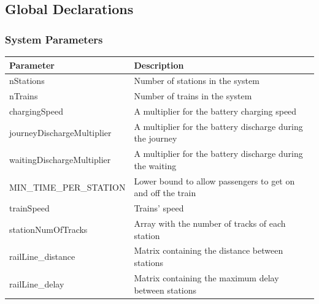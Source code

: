 \subsection{Global Declarations}
\subsubsection{System Parameters}

\begin{table} [H]
    \begin{tabu} to \textwidth {|X|X[2]|}
        \hline
        \textbf{Parameter}              & \textbf{Description} \\  \hline
        nStations                       & Number of stations in the system \\  \hline
        nTrains                         & Number of trains in the system \\    \hline
        chargingSpeed                   & A multiplier for the battery charging speed \\    \hline
        journeyDischargeMultiplier      & A multiplier for the battery discharge during the journey \\  \hline
        waitingDischargeMultiplier      & A multiplier for the battery discharge during the waiting \\  \hline
        MIN\_TIME\_PER\_STATION         & Lower bound to allow passengers to get on and off the train \\    \hline
        trainSpeed                      & Trains' speed \\   \hline
        stationNumOfTracks              & Array with the number of tracks of each station \\   \hline
        railLine\_distance              & Matrix containing the distance between stations \\    \hline
        railLine\_delay                 & Matrix containing the maximum delay between stations \\   \hline
    \end{tabu}
\end{table}
\bigskip


